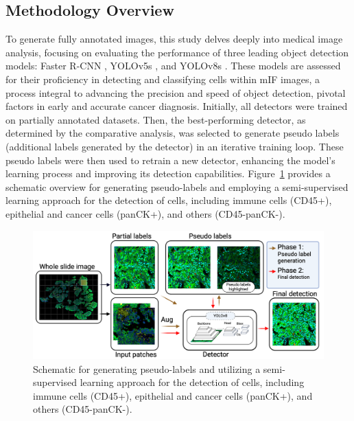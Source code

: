 \documentclass{midl} %
\begin{document}
\subsection{Methodology Overview}
To generate fully annotated images, this study delves deeply into medical image analysis, focusing on evaluating the performance of three leading object detection models: Faster R-CNN \cite{ren2015faster}, YOLOv5s \cite{yolov5}, and YOLOv8s \cite{ultralytics2023}. These models are assessed for their proficiency in detecting and classifying cells within mIF images, a process integral to advancing the precision and speed of object detection, pivotal factors in early and accurate cancer diagnosis. Initially, all detectors were trained on partially annotated datasets. Then, the best-performing detector, as determined by the comparative analysis, was selected to generate pseudo labels (additional labels generated by the detector) in an iterative training loop. These pseudo labels were then used to retrain a new detector, enhancing the model’s learning process and improving its detection capabilities. Figure~\ref{fig:1} provides a schematic overview for generating pseudo-labels and employing a semi-supervised learning approach for the detection of cells, including immune cells (CD45+), epithelial and cancer cells (panCK+), and others (CD45-panCK-). 
\begin{figure}[!htbp]
\centering
\includegraphics[width=0.9\linewidth]{images/1.png}
\caption{Schematic for generating pseudo-labels and utilizing a semi-supervised learning approach for the detection of cells, including immune cells (CD45+), epithelial and cancer cells (panCK+), and others (CD45-panCK-).}
\label{fig:1}
\end{figure}
\vspace{-1em}
\end{document}
